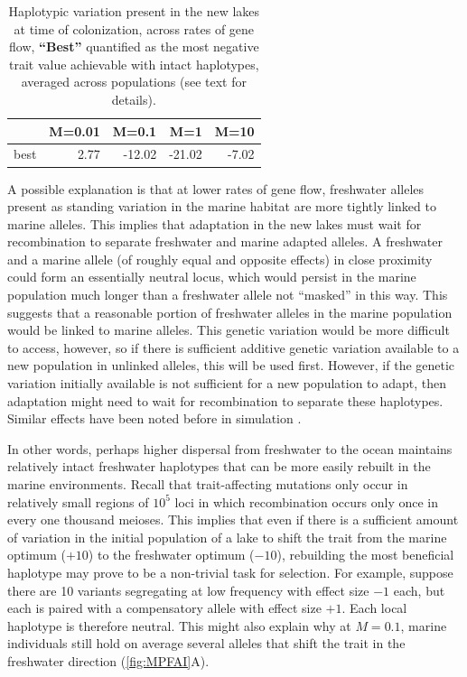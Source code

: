 \documentclass{article}
\begin{document}
\begin{table}[ht]
    \centering
    \begin{tabular}{rrrrr}
      \hline
     & M=0.01 & M=0.1 & M=1 & M=10 \\ 
      \hline
          best & 2.77 & -12.02 & -21.02 & -7.02 \\ 
       \hline
    \end{tabular}
    \caption{
        Haplotypic variation present in the new lakes at time of colonization,
        across rates of gene flow,
        \textbf{``Best''} 
        quantified as the most negative trait value achievable
        with intact haplotypes, averaged across populations
        (see text for details).
    } \label{tab:linkage}
\end{table}

A possible explanation is that at lower rates of gene flow, freshwater alleles present as standing variation in the marine habitat are more tightly linked to marine alleles.  
This implies that adaptation in the new lakes must wait for recombination to separate freshwater and marine adapted alleles.
A freshwater and a marine allele (of roughly equal and opposite effects) in close proximity
could form an essentially neutral locus,
which would persist in the marine population much longer than a freshwater allele
not ``masked'' in this way.
This suggests that a reasonable portion of freshwater alleles in the marine population
would be linked to marine alleles.
This genetic variation would be more difficult to access, however,
so if there is sufficient additive genetic variation available to a new population in unlinked alleles,
this will be used first.
However, if the genetic variation initially available is not sufficient for a new population to adapt,
then adaptation might need to wait for recombination to separate these haplotypes.
Similar effects have been noted before in simulation \citep[e.g.,][]{yeaman2011genetic}.

In other words, perhaps higher dispersal from freshwater to the ocean maintains relatively intact freshwater haplotypes that can be more easily rebuilt in the marine environments. Recall that trait-affecting mutations only occur in relatively small regions of $10^5$ loci in which recombination occurs only once in every one thousand meioses. This implies that even if there is a sufficient amount of variation in the initial population of a lake to shift the trait from the marine optimum ($+10$) to the freshwater optimum ($-10$), rebuilding the most beneficial haplotype may prove to be a non-trivial task for selection.
For example, suppose there are 10 variants segregating at low frequency with effect size $-1$ each, but each is paired with a compensatory allele with effect size $+1$. Each local haplotype is therefore neutral. This might also explain why at $M=0.1$, marine individuals still hold on average several alleles that shift the trait in the freshwater direction
(\autoref{fig:MPFAI}A).
\end{document}
